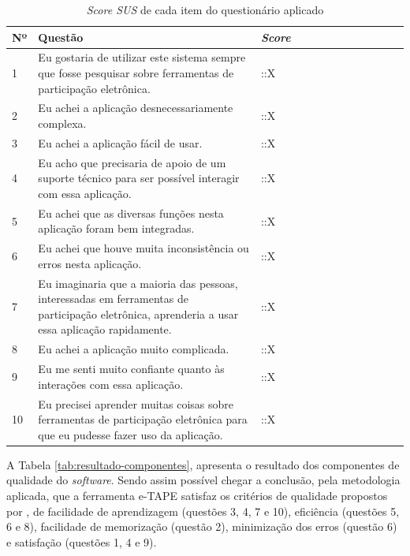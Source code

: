 \begin{table}[!ht]
    \centering
    \caption{\textit{Score SUS} de cada item do questionário aplicado}
    \label{tab:resultado-questionario}
    \begin{tabular}{l*{3}{>{\raggedright\arraybackslash}p{0.66\linewidth}p{0.1\linewidth}}}
    \toprule
    Nº & Questão & \textit{Score}    \\
    \midrule
    1 & Eu gostaria de utilizar este sistema sempre que fosse pesquisar sobre ferramentas de participação eletrônica. & ::X \\
    2 & Eu achei a aplicação desnecessariamente complexa. & ::X \\
    3 & Eu achei a aplicação fácil de usar. & ::X \\
    4 & Eu acho que precisaria de apoio de um suporte técnico para ser possível interagir com essa aplicação. & ::X \\
    5 & Eu achei que as diversas funções nesta aplicação foram bem integradas.  & ::X \\
    6 & Eu achei que houve muita inconsistência ou erros nesta aplicação.  & ::X \\
    7 & Eu imaginaria que a maioria das pessoas, interessadas em ferramentas de participação eletrônica, aprenderia a usar essa aplicação rapidamente. & ::X \\
    8 & Eu achei a aplicação muito complicada.  & ::X \\
    9 & Eu me senti muito confiante quanto às interações com essa aplicação.  & ::X \\
    10 & Eu precisei aprender muitas coisas sobre ferramentas de participação eletrônica para que eu pudesse fazer uso da aplicação. & ::X \\
    \bottomrule
    \end{tabular}
\end{table}

\par
A Tabela \ref{tab:resultado-componentes}, apresenta o resultado dos componentes de qualidade do \textit{software}. Sendo assim possível chegar a conclusão, pela metodologia aplicada, 
que a ferramenta e-TAPE satisfaz os critérios de qualidade propostos por , de facilidade de aprendizagem (questões 3, 4, 7 e 10), eficiência (questões 5, 6 e 8),
facilidade de memorização (questão 2), minimização dos erros (questão 6) e satisfação (questões 1, 4 e 9).

